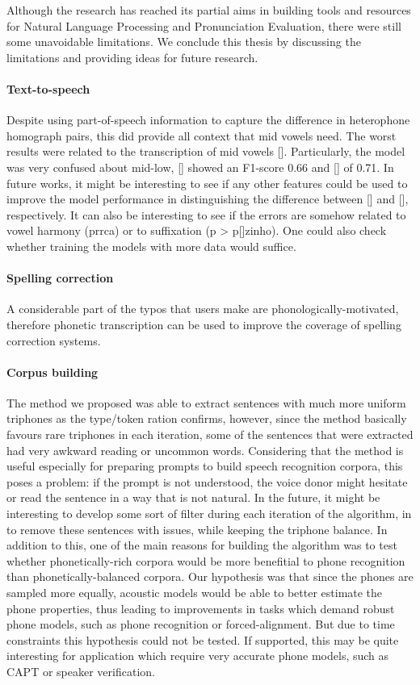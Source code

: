 Although the research has reached its partial aims in building tools and resources for Natural Language Processing and Pronunciation Evaluation, there were still some unavoidable limitations. We conclude this thesis by discussing the limitations and providing ideas for future research.

\paragraph*{Text-to-speech}
Despite using part-of-speech information to capture the difference in heterophone homograph pairs, this did provide all context that mid vowels need. The worst results were related to the transcription of mid vowels []. Particularly, the model was very confused about mid-low, [] showed an F1-score 0.66 and [] of 0.71. In future works, it might be interesting to see if any other features could be used to improve the model performance in distinguishing the difference between [] and [], respectively. It can also be interesting to see if the errors are somehow related to vowel harmony (prrca) or to suffixation (p > p[]zinho). One could also check whether training the models with more data would suffice.

\paragraph*{Spelling correction}
A considerable part of the typos that users make are phonologically-motivated, therefore phonetic transcription can be used to improve the coverage of spelling correction systems.

\paragraph*{Corpus building}
The method we proposed was able to extract sentences with much more uniform triphones as the type/token ration confirms, however, since the method basically favours rare triphones in each iteration, some of the sentences that were extracted had very awkward reading or uncommon words. Considering that the method is useful especially for preparing prompts to build speech recognition corpora, this poses a problem: if the prompt is not understood, the voice donor might hesitate or read the sentence in a way that is not natural. In the future, it might be interesting to develop some sort of filter during each iteration of the algorithm, in to remove these sentences with issues, while keeping the triphone balance. In addition to this, one of the main reasons for building the algorithm was to test whether phonetically-rich corpora would be more benefitial to phone recognition than phonetically-balanced corpora. Our hypothesis was that  since the phones are sampled more equally, acoustic models would be able to better estimate the phone properties, thus leading to improvements in tasks which demand robust phone models, such as phone recognition or forced-alignment. But due to time constraints this hypothesis could not be tested. If supported, this may be quite interesting for application which require very accurate phone models, such as \ac{CAPT} or speaker verification.

